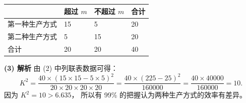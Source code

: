 \begin{answer}
\begin{center}
\begin{tabular}{llll}
\toprule
 & 超过 $m$ & 不超过 $m$ & 合计 \\
\midrule
第一种生产方式 & 15 & 5 & 20 \\
第二种生产方式 & 5 & 15 & 20 \\
合计 & 20 & 20 & 40 \\
\bottomrule
\end{tabular}
\end{center}

\textbf{(3) 解析} 由 (2) 中列联表数据可得：
\nopagebreak[4]
\[K^2 = \dfrac{40\times(15\times 15 - 5\times 5)^2}{20\times 20\times 20\times 20} = \dfrac{40\times(225 - 25)^2}{160000} = \dfrac{40\times 40000}{160000} = 10.\]
因为 $K^2 = 10 > 6.635$，
所以有 99\% 的把握认为两种生产方式的效率有差异。




\end{answer}
